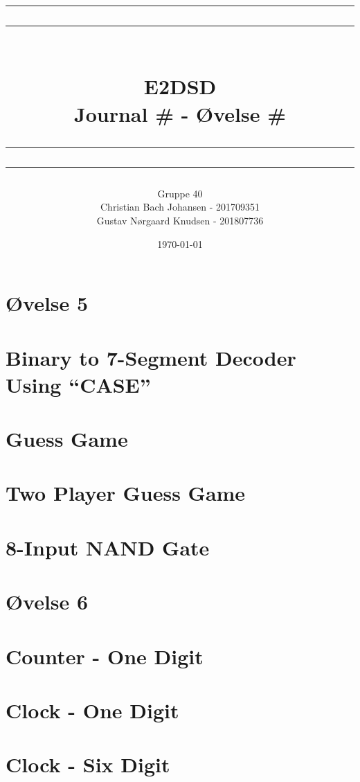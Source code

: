 \documentclass[12pt,a4paper]{article}
\newcommand\mymaketitle[1]{
   \rule{\textwidth}{1.6pt}\vspace*{-\baselineskip}\vspace*{2pt}
   \rule{\textwidth}{0.4pt}
   \\  
   \huge \bf #1\\
   \vspace{-8pt}
   \rule{\textwidth}{0.4pt}\vspace*{-\baselineskip}\vspace{3.2pt}
   \rule{\textwidth}{1.6pt}
}
\begin{document}
\title{
	\mymaketitle{E2DSD\\Journal \# - Øvelse \#}
}
\author{
	Gruppe 40\\
	Christian Bach Johansen - 201709351\\
	Gustav Nørgaard Knudsen - 201807736
}
\date{\today}

\maketitle

\section*{Øvelse 5}

\section{Binary to 7-Segment Decoder Using “CASE”}


\section{Guess Game}


\section{Two Player Guess Game}


\section{8-Input NAND Gate}


\section*{Øvelse 6}

\section{Counter - One Digit}


\section{Clock - One Digit}


\section{Clock - Six Digit}

\end{document}
